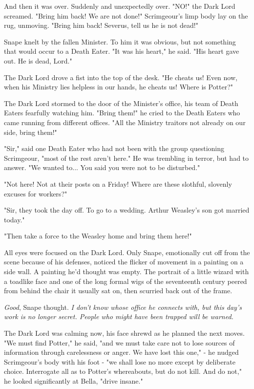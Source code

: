 And then it was over. Suddenly and unexpectedly over. "NO!" the Dark Lord screamed. "Bring him back! We are not done!" Scrimgeour's limp body lay on the rug, unmoving. "Bring him back! Severus, tell us he is not dead!"

Snape knelt by the fallen Minister. To him it was obvious, but not something that would occur to a Death Eater. "It was his heart," he said. "His heart gave out. He is dead, Lord."

The Dark Lord drove a fist into the top of the desk. "He cheats us! Even now, when his Ministry lies helpless in our hands, he cheats us! Where is Potter?"

The Dark Lord stormed to the door of the Minister's office, his team of Death Eaters fearfully watching him. "Bring them!" he cried to the Death Eaters who came running from different offices. "All the Ministry traitors not already on our side, bring them!"

"Sir," said one Death Eater who had not been with the group questioning Scrimgeour, "most of the rest aren't here." He was trembling in terror, but had to answer. "We wanted to... You said you were not to be disturbed."

"Not here! Not at their posts on a Friday! Where are these slothful, slovenly excuses for workers?"

"Sir, they took the day off. To go to a wedding. Arthur Weasley's son got married today."

"Then take a force to the Weasley home and bring them here!"

All eyes were focused on the Dark Lord. Only Snape, emotionally cut off from the scene because of his defenses, noticed the flicker of movement in a painting on a side wall. A painting he'd thought was empty. The portrait of a little wizard with a toadlike face and one of the long formal wigs of the seventeenth century peered from behind the chair it usually sat on, then scurried back out of the frame.

\emph{Good}, Snape thought. \emph{I don't know whose office he connects with, but this day's work is no longer secret. People who might have been trapped will be warned.}

The Dark Lord was calming now, his face shrewd as he planned the next moves. "We must find Potter," he said, "and we must take care not to lose sources of information through carelessness or anger. We have lost this one," - he nudged Scrimgeour's body with his foot - "we shall lose no more except by deliberate choice. Interrogate all as to Potter's whereabouts, but do not kill. And do not," he looked significantly at Bella, "drive insane."

